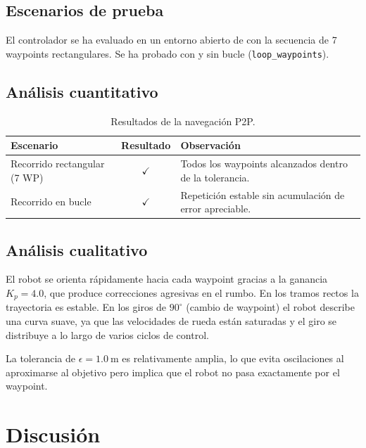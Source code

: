 \documentclass[12pt]{article}
\begin{document}
\subsection{Escenarios de prueba}
El controlador se ha evaluado en un entorno abierto de \coppelia{} con la secuencia de 7 waypoints rectangulares. Se ha probado con y sin bucle (\texttt{loop\_waypoints}).

\subsection{An\'{a}lisis cuantitativo}

\begin{table}[H]
  \centering
  \caption{Resultados de la navegaci\'{o}n P2P.}
  \label{tab:resultados}
  \begin{tabularx}{0.98\linewidth}{l c X}
    \toprule
    \textbf{Escenario} & \textbf{Resultado} & \textbf{Observaci\'{o}n} \\
    \midrule
    Recorrido rectangular (7 WP) & $\checkmark$ & Todos los waypoints alcanzados dentro de la tolerancia. \\
    Recorrido en bucle            & $\checkmark$ & Repetici\'{o}n estable sin acumulaci\'{o}n de error apreciable. \\
    \bottomrule
  \end{tabularx}
\end{table}

\subsection{An\'{a}lisis cualitativo}
El robot se orienta r\'{a}pidamente hacia cada waypoint gracias a la ganancia $K_p = 4.0$, que produce correcciones agresivas en el rumbo. En los tramos rectos la trayectoria es estable. En los giros de $90^\circ$ (cambio de waypoint) el robot describe una curva suave, ya que las velocidades de rueda est\'{a}n saturadas y el giro se distribuye a lo largo de varios ciclos de control.

La tolerancia de $\epsilon = \SI{1.0}{\meter}$ es relativamente amplia, lo que evita oscilaciones al aproximarse al objetivo pero implica que el robot no pasa exactamente por el waypoint.


\section{Discusi\'{o}n}
\end{document}
